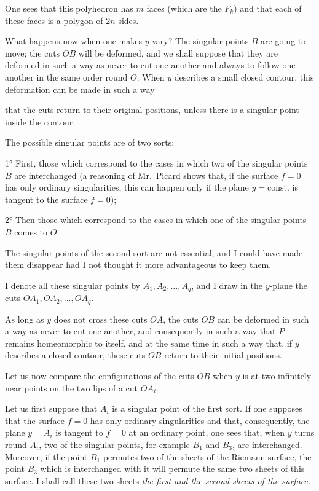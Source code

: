 \documentclass{article}
\begin{document}
One sees that this polyhedron has $m$ faces (which are the $F_{k}$) and that each of these faces is a polygon of $2n$ sides.

What happens now when one makes $y$ vary? The singular points $B$ are going to move; the cuts $OB$ will be deformed, and we shall suppose that they are deformed in such a way as never to cut one another and always to follow one another in the same order round $O$. When $y$ describes a small closed contour, this deformation can be made in such a way

that the cuts return to their original positions, unless there is a singular point inside the contour.

The possible singular points are of two sorts:

1° First, those which correspond to the cases in which two of the singular points $B$ are interchanged (a reasoning of Mr.~Picard shows that, if the surface $f = 0$ has only ordinary singularities, this can happen only if the plane $y = \text{const.}$ is tangent to the surface $f = 0$);

2° Then those which correspond to the cases in which one of the singular points $B$ comes to $O$.

The singular points of the second sort are not essential, and I could have made them disappear had I not thought it more advantageous to keep them.

I denote all these singular points by $A_{1}, A_{2}, \ldots, A_{q}$, and I draw in the $y$-plane the cuts $OA_{1}, OA_{2}, \ldots, OA_{q}$.

As long as $y$ does not cross these cuts $OA$, the cuts $OB$ can be deformed in such a way as never to cut one another, and consequently in such a way that $P$ remains homeomorphic to itself, and at the same time in such a way that, if $y$ describes a closed contour, these cuts $OB$ return to their initial positions.

Let us now compare the configurations of the cuts $OB$ when $y$ is at two infinitely near points on the two lips of a cut $OA_{i}$.

Let us first suppose that $A_{i}$ is a singular point of the first sort. If one supposes that the surface $f = 0$ has only ordinary singularities and that, consequently, the plane $y = A_{i}$ is tangent to $f = 0$ at an ordinary point, one sees that, when $y$ turns round $A_{i}$, two of the singular points, for example $B_{1}$ and $B_{3}$, are interchanged. Moreover, if the point $B_{1}$ permutes two of the sheets of the Riemann surface, the point $B_{3}$ which is interchanged with it will permute the same two sheets of this surface. I shall call these two sheets \emph{the first and the second sheets of the surface}.
\end{document}
